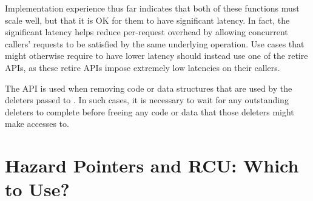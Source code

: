 \documentclass[letterpaper,10pt]{article}
\begin{document}
Implementation experience thus far indicates that both of these functions must
scale well, but that it is OK for them to have significant latency.
In fact, the significant latency helps reduce per-request overhead
by allowing concurrent callers' requests to be satisfied by the same
underlying operation.
Use cases that might otherwise require  to
have lower latency should instead use one of the retire APIs, as
these retire APIs impose extremely low latencies on their callers.

The  API is used when removing code or data structures
that are used by the deleters passed to .
In such cases, it is necessary to wait for any outstanding deleters to
complete before freeing any code or data that those deleters might
make accesses to.

\section{Hazard Pointers and RCU: Which to Use?}
\label{sec:Hazard Pointers and RCU: Which to Use?}
\end{document}
